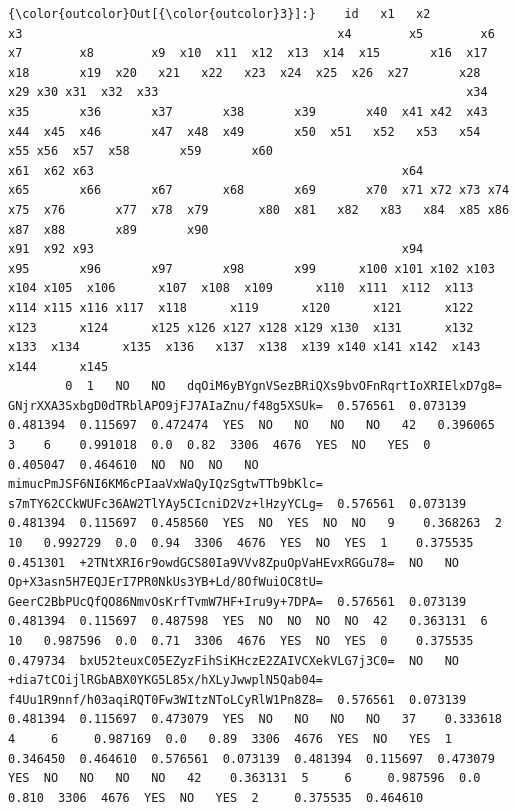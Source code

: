 \documentclass[11pt]{article}
\begin{document}
\begin{Verbatim}[commandchars=\\\{\}]
{\color{outcolor}Out[{\color{outcolor}3}]:}    id   x1   x2                                            x3                                            x4        x5        x6        x7        x8        x9  x10  x11  x12  x13  x14  x15       x16  x17  x18       x19  x20   x21   x22   x23  x24  x25  x26  x27       x28       x29 x30 x31  x32  x33                                           x34                                           x35       x36       x37       x38       x39       x40  x41 x42  x43 x44  x45  x46       x47  x48  x49       x50  x51   x52   x53   x54  x55 x56  x57  x58       x59       x60                                           x61  x62 x63                                           x64                                           x65       x66       x67       x68       x69       x70  x71 x72 x73 x74 x75  x76       x77  x78  x79       x80  x81   x82   x83   x84  x85 x86  x87  x88       x89       x90                                           x91  x92 x93                                           x94                                           x95       x96       x97       x98       x99      x100 x101 x102 x103 x104 x105  x106      x107  x108  x109      x110  x111  x112  x113  x114 x115 x116 x117  x118      x119      x120      x121      x122      x123      x124      x125 x126 x127 x128 x129 x130  x131      x132  x133  x134      x135  x136   x137  x138  x139 x140 x141 x142  x143      x144      x145
        0  1   NO   NO   dqOiM6yBYgnVSezBRiQXs9bvOFnRqrtIoXRIElxD7g8=  GNjrXXA3SxbgD0dTRblAPO9jFJ7AIaZnu/f48g5XSUk=  0.576561  0.073139  0.481394  0.115697  0.472474  YES  NO   NO   NO   NO   42   0.396065  3    6    0.991018  0.0  0.82  3306  4676  YES  NO   YES  0    0.405047  0.464610  NO  NO  NO   NO   mimucPmJSF6NI6KM6cPIaaVxWaQyIQzSgtwTTb9bKlc=  s7mTY62CCkWUFc36AW2TlYAy5CIcniD2Vz+lHzyYCLg=  0.576561  0.073139  0.481394  0.115697  0.458560  YES  NO  YES  NO  NO   9    0.368263  2    10   0.992729  0.0  0.94  3306  4676  YES  NO  YES  1    0.375535  0.451301  +2TNtXRI6r9owdGCS80Ia9VVv8ZpuOpVaHEvxRGGu78=  NO   NO  Op+X3asn5H7EQJErI7PR0NkUs3YB+Ld/8OfWuiOC8tU=  GeerC2BbPUcQfQO86NmvOsKrfTvmW7HF+Iru9y+7DPA=  0.576561  0.073139  0.481394  0.115697  0.487598  YES  NO  NO  NO  NO  42   0.363131  6    10   0.987596  0.0  0.71  3306  4676  YES  NO  YES  0    0.375535  0.479734  bxU52teuxC05EZyzFihSiKHczE2ZAIVCXekVLG7j3C0=  NO   NO  +dia7tCOijlRGbABX0YKG5L85x/hXLyJwwplN5Qab04=  f4Uu1R9nnf/h03aqiRQT0Fw3WItzNToLCyRlW1Pn8Z8=  0.576561  0.073139  0.481394  0.115697  0.473079  YES  NO   NO   NO   NO   37    0.333618  4     6     0.987169  0.0   0.89  3306  4676  YES  NO   YES  1     0.346450  0.464610  0.576561  0.073139  0.481394  0.115697  0.473079  YES  NO   NO   NO   NO   42    0.363131  5     6     0.987596  0.0   0.810  3306  4676  YES  NO   YES  2     0.375535  0.464610

\end{Verbatim}
\end{document}
